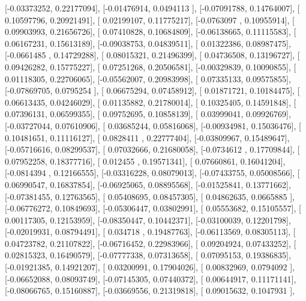 \documentclass{article}
\begin{document}
       [-0.03373252,  0.22177094],
       [-0.01476914,  0.0494113 ],
       [-0.07091788,  0.14764007],
       [ 0.10597796,  0.20921491],
       [ 0.02199107,  0.11775217],
       [-0.0763097 ,  0.10955914],
       [ 0.09903993,  0.21656726],
       [ 0.07410828,  0.10684809],
       [-0.06138665,  0.11115583],
       [ 0.06167231,  0.15613189],
       [-0.09038753,  0.04839511],
       [ 0.01322386,  0.08987475],
       [-0.0661485 ,  0.14729288],
       [ 0.08015321,  0.21496399],
       [ 0.04736508,  0.13196727],
       [ 0.09426282,  0.15775227],
       [ 0.07251268,  0.20506581],
       [-0.00329839,  0.10090855],
       [ 0.01118305,  0.22706065],
       [-0.05562007,  0.20983998],
       [ 0.07335133,  0.09575855],
       [-0.07869705,  0.0795254 ],
       [ 0.06675294,  0.07458912],
       [ 0.01871721,  0.10184475],
       [ 0.06613435,  0.04246029],
       [ 0.01135882,  0.21780014],
       [ 0.10325405,  0.14591848],
       [ 0.07396131,  0.06599355],
       [ 0.09752695,  0.10858139],
       [ 0.03999041,  0.09926769],
       [-0.03727044,  0.07610906],
       [ 0.03685244,  0.05816068],
       [-0.00934981,  0.15036476],
       [ 0.10481651,  0.11116127],
       [ 0.0828411 ,  0.22777404],
       [-0.03809967,  0.15489647],
       [-0.05716616,  0.08299537],
       [ 0.07032666,  0.21680058],
       [-0.0734612 ,  0.17709844],
       [ 0.07952258,  0.18377716],
       [ 0.012455  ,  0.19571341],
       [ 0.07660861,  0.16041204],
       [-0.0814394 ,  0.12166555],
       [-0.03316228,  0.08079013],
       [-0.07433755,  0.05008566],
       [ 0.06990547,  0.16837854],
       [-0.06925065,  0.08895568],
       [-0.01525841,  0.13771662],
       [-0.07381455,  0.12763565],
       [ 0.05408695,  0.08457305],
       [ 0.04862635,  0.0665885 ],
       [-0.06776272,  0.10849693],
       [-0.05306447,  0.03802991],
       [ 0.05553682,  0.15105557],
       [ 0.00117305,  0.12153959],
       [-0.08350447,  0.10442371],
       [-0.03100039,  0.12201798],
       [-0.02019931,  0.08794491],
       [ 0.034718  ,  0.19487763],
       [-0.06113569,  0.08305113],
       [ 0.04723782,  0.21107822],
       [-0.06716452,  0.22983966],
       [ 0.09204924,  0.07433252],
       [ 0.02815323,  0.16490579],
       [-0.07777338,  0.07313658],
       [ 0.07095153,  0.19386835],
       [-0.01921385,  0.14921207],
       [ 0.03200991,  0.17904026],
       [ 0.00832969,  0.0794092 ],
       [-0.06652088,  0.08093749],
       [-0.07145305,  0.07440372],
       [ 0.00644917,  0.11171141],
       [-0.08066765,  0.15160887],
       [-0.03669556,  0.21319818],
       [ 0.09015632,  0.1047931 ],
\end{document}
